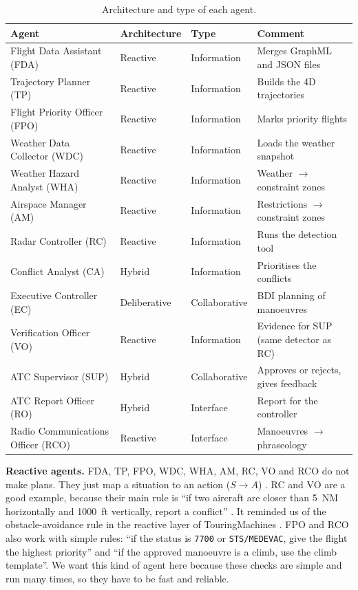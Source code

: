 \begin{table}[H]
\centering
\small
\caption{Architecture and type of each agent.}
\label{tab:classification}
\begin{tabularx}{\textwidth}{@{}l l l X@{}}
\toprule
\textbf{Agent} & \textbf{Architecture} & \textbf{Type} & \textbf{Comment} \\
\midrule
Flight Data Assistant (FDA)        & Reactive     & Information   & Merges GraphML and JSON files \\
Trajectory Planner (TP)          & Reactive     & Information   & Builds the 4D trajectories \\
Flight Priority Officer (FPO)     & Reactive     & Information   & Marks priority flights \\
Weather Data Collector (WDC)     & Reactive     & Information   & Loads the weather snapshot \\
Weather Hazard Analyst (WHA)     & Reactive     & Information   & Weather $\rightarrow$ constraint zones  \\
Airspace Manager (AM)            & Reactive     & Information   & Restrictions $\rightarrow$ constraint zones \\
Radar Controller (RC)            & Reactive     & Information   & Runs the detection tool \\
Conflict Analyst (CA)            & Hybrid       & Information   & Prioritises the conflicts \\
Executive Controller (EC)        & Deliberative & Collaborative & BDI planning of manoeuvres \\
Verification Officer (VO)         & Reactive     & Information   & Evidence for SUP (same detector as RC) \\
ATC Supervisor (SUP)              & Hybrid       & Collaborative & Approves or rejects, gives feedback \\
ATC Report Officer (RO)           & Hybrid       & Interface     & Report for the controller \\
Radio Communications Officer (RCO) & Reactive     & Interface     & Manoeuvres $\rightarrow$ phraseology \\
\bottomrule
\end{tabularx}
\end{table}

\textbf{Reactive agents.} FDA, TP, FPO, WDC, WHA, AM, RC, VO and RCO do not make plans. They
just map a situation to an action ($S \rightarrow A$) \cite{lecture2}. RC and VO are a
good example, because their main rule is ``if two aircraft are closer than 5~NM
horizontally and 1000~ft vertically, report a conflict'' \cite{icao_doc4444}. It reminded
us of the obstacle-avoidance rule in the reactive layer of TouringMachines
\cite{ferguson1992}. FPO and RCO also work with simple rules: ``if the status is \texttt{7700}
or \texttt{STS/MEDEVAC}, give the flight the highest priority'' and ``if the approved manoeuvre is a climb, use the climb
template''. We want this kind of agent here because these checks are simple and run many
times, so they have to be fast and reliable.


